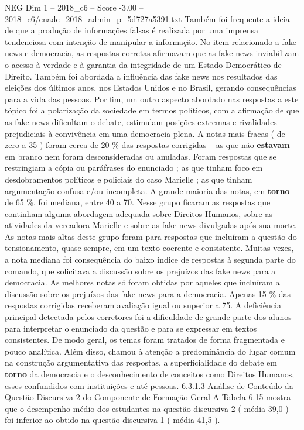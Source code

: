 \begin{textsample}{NEG Dim 1 – 2018\_c6 – Score -3.00 – 2018\_c6/enade\_2018\_admin\_p\_5d727a5391.txt}
Também foi frequente a ideia de que a produção de informações falsas é realizada por uma imprensa tendenciosa com intenção de manipular a informação.
No item relacionado a fake news e democracia, as respostas corretas afirmavam que as fake news inviabilizam o acesso à verdade e à garantia da integridade de um Estado Democrático de Direito.
Também foi abordada a influência das fake news nos resultados das eleições dos últimos anos, nos Estados Unidos e no Brasil, gerando consequências para a vida das pessoas.
Por fim, um outro aspecto abordado nas respostas a este tópico foi a polarização da sociedade em termos políticos, com a afirmação de que as fake news dificultam o debate, estimulam posições extremas e rivalidades prejudiciais à convivência em uma democracia plena.
A notas mais fracas ( de zero a 35 ) foram cerca de 20 \% das respostas corrigidas – as que não \textbf{estavam} em branco nem foram desconsideradas ou anuladas.
Foram respostas que se restringiam a cópia ou paráfrases do enunciado ; as que tinham foco em desdobramentos políticos e policiais do caso Marielle ; as que tinham argumentação confusa e/ou incompleta.
A grande maioria das notas, em \textbf{torno} de 65 \%, foi mediana, entre 40 a 70.
Nesse grupo ficaram as respostas que continham alguma abordagem adequada sobre Direitos Humanos, sobre as atividades da vereadora Marielle e sobre as fake news divulgadas após sua morte.
As notas mais altas deste grupo foram para respostas que incluíram a questão do tensionamento, quase sempre, em um texto coerente e consistente.
Muitas vezes, a nota mediana foi consequência do baixo índice de respostas à segunda parte do comando, que solicitava a discussão sobre os prejuízos das fake news para a democracia.
As melhores notas só foram obtidas por aqueles que incluíram a discussão sobre os prejuízos das fake news para a democracia.
Apenas 15 \% das respostas corrigidas receberam avaliação igual ou superior a 75.
A deficiência principal detectada pelos corretores foi a dificuldade de grande parte dos alunos para interpretar o enunciado da questão e para se expressar em textos consistentes.
De modo geral, os temas foram tratados de forma fragmentada e pouco analítica.
Além disso, chamou à atenção a predominância do lugar comum na construção argumentativa das respostas, a superficialidade do debate em \textbf{torno} da democracia e o desconhecimento de conceitos como Direitos Humanos, esses confundidos com instituições e até pessoas. 6.3.1.3 Análise de Conteúdo da Questão Discursiva 2 do Componente de Formação Geral A Tabela 6.15 mostra que o desempenho médio dos estudantes na questão discursiva 2 ( média 39,0 ) foi inferior ao obtido na questão discursiva 1 ( média 41,5 ).

\end{textsample}
